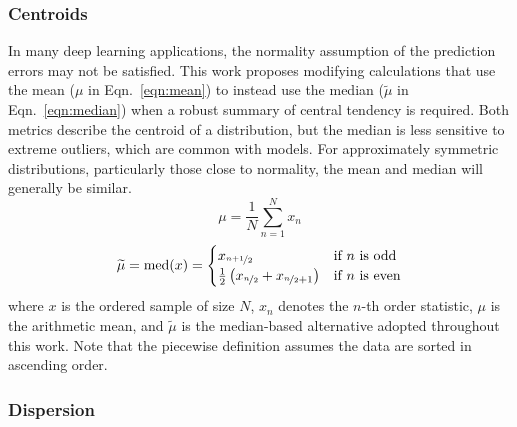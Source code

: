 \subsubsection{Centroids}
\label{sec:Eval:subsec:error:subsubsection:centroids}
In many deep learning applications, the normality assumption of the prediction errors may not be satisfied. This work proposes modifying calculations that use the mean ($\mu$ in Eqn.~\ref{eqn:mean}) to instead use the median ($\widetilde{\mu}$ in Eqn.~\ref{eqn:median}) when a robust summary of central tendency is required. Both metrics describe the centroid of a distribution, but the median is less sensitive to extreme outliers, which are common with \DL models. For approximately symmetric distributions, particularly those close to normality, the mean and median will generally be similar.
\begin{equation}\label{eqn:mean}
    \mu = \frac{1}{N}\sum_{n=1}^N x_n
\end{equation}
\begin{equation}\label{eqn:median}
    \widetilde{\mu} = \textnormal{med}(x) = \begin{cases}
        x_{\nicefrac{n+1}{2}} & \textnormal{if $n$ is odd}\\
        \frac{1}{2} \left(x_{\nicefrac{n}{2}}+x_{\nicefrac{n}{2}+1}\right) & \textnormal{if $n$ is even}
    \end{cases}
\end{equation}
\noindent where $x$ is the ordered sample of size $N$, $x_n$ denotes the $n$-th order statistic, $\mu$ is the arithmetic mean, and $\widetilde{\mu}$ is the median-based alternative adopted throughout this work. Note that the piecewise definition assumes the data are sorted in ascending order.

\subsubsection{Dispersion}\label{sec:Eval:subsec:error:subsubsection:dispersion}
